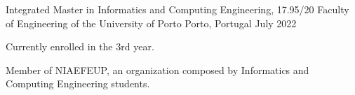 
\begin{cventries}
  \cventry
    {Integrated Master in Informatics and Computing Engineering, 17.95/20} %
    {Faculty of Engineering of the University of Porto} %
    {Porto, Portugal} %
    {July 2022} %
    {
      \begin{cvitems}
        \item {Currently enrolled in the 3rd year.}
        \item {Member of NIAEFEUP, an organization composed by Informatics and Computing Engineering students.}
      \end{cvitems}
    }
\end{cventries}
